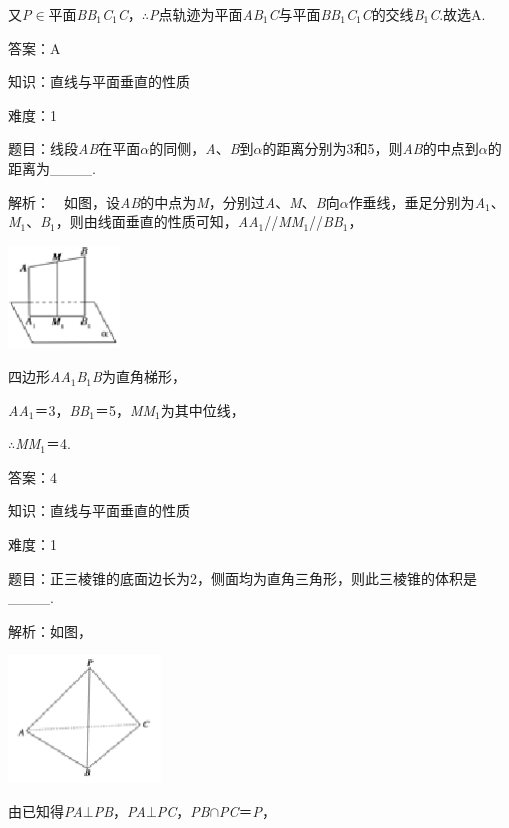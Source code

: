 \documentclass{article} %
\begin{document}
又\textit{P}$\mathrm{\in}$平面\textit{BB}${}_{1}$\textit{C}${}_{1}$\textit{C}，$\mathrm{\therefore}$\textit{P}点轨迹为平面\textit{AB}${}_{1}$\textit{C}与平面\textit{BB}${}_{1}$\textit{C}${}_{1}$\textit{C}的交线\textit{B}${}_{1}$\textit{C}.故选A.

答案：A

知识：直线与平面垂直的性质

难度：1

题目：线段\textit{AB}在平面\textit{$\alpha$}的同侧，\textit{A}、\textit{B}到\textit{$\alpha$}的距离分别为3和5，则\textit{AB}的中点到\textit{$\alpha$}的距离为\_\_\_\_.

解析：　如图，设\textit{AB}的中点为\textit{M}，分别过\textit{A}、\textit{M}、\textit{B}向\textit{$\alpha$}作垂线，垂足分别为\textit{A}${}_{1}$、\textit{M}${}_{1}$、\textit{B}${}_{1}$，则由线面垂直的性质可知，\textit{AA}${}_{1}$//\textit{MM}${}_{1}$//\textit{BB}${}_{1}$，

\includegraphics*[width=1.17in, height=1.07in, keepaspectratio=false]{image235}

四边形\textit{AA}${}_{1}$\textit{B}${}_{1}$\textit{B}为直角梯形，

\textit{AA}${}_{1}$＝3，\textit{BB}${}_{1}$＝5，\textit{MM}${}_{1}$为其中位线，

$\mathrm{\therefore}$\textit{MM}${}_{1}$＝4.

答案：4

知识：直线与平面垂直的性质

难度：1

题目：正三棱锥的底面边长为2，侧面均为直角三角形，则此三棱锥的体积是\_\_\_\_.

解析：如图，

\includegraphics*[width=1.60in, height=1.33in, keepaspectratio=false]{image236}

由已知得\textit{PA}$\mathrm{\bot}$\textit{PB}，\textit{PA}$\mathrm{\bot}$\textit{PC}，\textit{PB}$\mathrm{\cap}$\textit{PC}＝\textit{P}，
\end{document}
